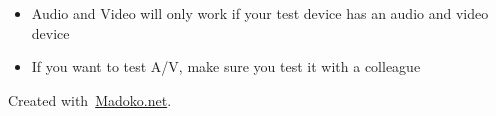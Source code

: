 \documentclass{article}
\begin{document}
\begin{itemize}[noitemsep,topsep=\mdcompacttopsep]%

\item{}Audio and Video will only work if your test device has an audio and video device%

\item{}If you want to test A/V, make sure you test it with a colleague%
\end{itemize}%

\begin{mdbmargintb}{4em}{}%
\begin{mdflushright}%
{\tiny{}Created with~\href{https://www.madoko.net}{Madoko.net}.}%
\end{mdflushright}%
\end{mdbmargintb}%
\end{document}
